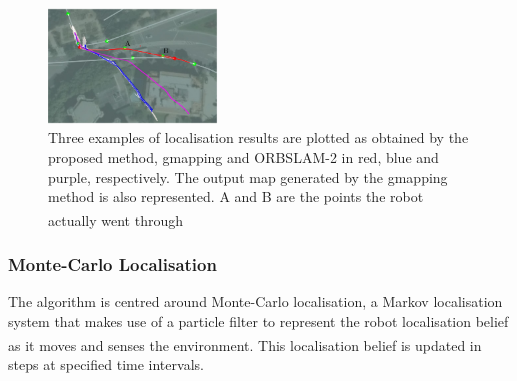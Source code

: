 \documentclass[11pt]{article}		%
\newcommand{\supercite}[1]{\textsuperscript{\cite{#1}}}		%
\begin{document}
	   \begin{figure}[H]
			\centering
			\includegraphics[width=0.4\textwidth]{localisationalgocomparison.jpg}
			\caption{Three examples of localisation results are plotted as obtained by the proposed method, gmapping and ORBSLAM-2 in red, blue and purple, respectively. The output map generated by the gmapping method is also represented. A and B are the points the robot actually went through\supercite{ELFTransmitter}}
			\label{localisationExamples}
		\end{figure}
		
		\subsubsection{Monte-Carlo Localisation}
		                		
		\begin{floatingfigure}[r]{0pt} \end{floatingfigure}
	    The algorithm is centred around Monte-Carlo localisation, a Markov localisation system that makes use of a particle filter to represent the robot localisation belief as it moves and senses the environment\supercite{montecarlo}. This localisation belief is updated in steps at specified time intervals. 
        
\end{document}
